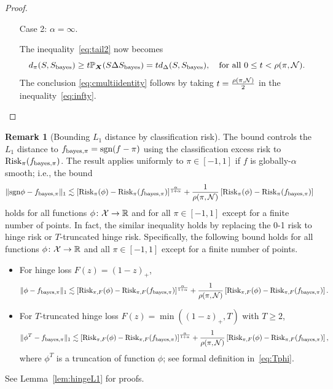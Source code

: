 \documentclass[11pt]{article}
\theoremstyle{plain}
\theoremstyle{definition}
\newtheorem{rmk}{Remark}
\def\sign{\textup{sgn}}
\def\bayesS{S_{\textup{bayes}}}
\def\bayespif{f_{\textup{bayes},\pi}}
\def\risk{\textup{Risk}_\pi}
\def\riskF{\textup{Risk}_{\pi,F}}
\begin{document}
\begin{proof}
\begin{enumerate}[label={2.\arabic*},wide, labelwidth=!, labelindent=0pt]
\item [Case 2:] $\alpha = \infty$.

The inequality~\eqref{eq:tail2} now becomes
\begin{equation}\label{eq:infty}
d_\pi(S,\bayesS)\geq t\mathbb{P}_{\mX}(S\Delta \bayesS) = td_\Delta(S,\bayesS), \quad \text{for all }0\leq t < \rho(\pi,\tN).
\end{equation}
The conclusion \eqref{eq:cmultiidentity} follows by taking $t={\rho(\pi,\mathcal{N})\over 2}$ in the inequality~\eqref{eq:infty}. 
\end{enumerate}
\end{proof}


\begin{rmk}[Bounding $L_1$ distance by classification risk]\label{eq:rmk} The bound controls the $L_1$ distance to $\bayespif=\sign(f-\pi)$ using the classification excess risk to $\risk(\bayespif)$. The result applies uniformly to $\pi\in[-1,1]$ if $f$ is globally-$\alpha$ smooth; i.e., the bound
\begin{equation}\label{eq:L1}
\onenormSize{}{\sign \phi-\bayespif} \lesssim \left[\risk(\phi)-\risk(\bayespif)\right]^{\alpha \over 1+\alpha}+{1\over \rho(\pi, \tN)}\left[\risk(\phi)-\risk(\bayespif)\right]
\end{equation}
holds for all functions $\phi\colon \mathcal{X}\to\mathbb{R}$ and for all $\pi\in[-1,1]$ except for a finite number of points. 
In fact, the similar inequality holds by replacing the 0-1 risk to hinge risk or $T$-truncated hinge risk. Specifically, the following bound holds for all functions $\phi\colon \mathcal{X}\to \mathbb{R}$ and all $\pi\in[-1,1]$ except for a finite number of points.
\begin{itemize}
\item For hinge loss $F(z)=(1-z)_{+}$,
\[
\onenormSize{}{\phi-\bayespif} \lesssim \left[\riskF(\phi)-\riskF(\bayespif)\right]^{\alpha \over 1+\alpha}+{1\over \rho(\pi, \tN)}\left[\riskF(\phi)-\riskF(\bayespif)\right].
\]
\item For $T$-truncated hinge loss $F(z)=\min((1-z)_{+},T)$ with $T\geq 2$,
\[
\onenormSize{}{\phi^T-\bayespif} \lesssim \left[\riskF(\phi)-\riskF(\bayespif)\right]^{\alpha \over 1+\alpha}+{1\over \rho(\pi, \tN)}\left[\riskF(\phi)-\riskF(\bayespif)\right],
\]
where $\phi^T$ is a truncation of function $\phi$; see formal definition in~\eqref{eq:Tphi}.
\end{itemize}
See Lemma~\ref{lem:hingeL1} for proofs. 
\end{rmk}
\end{document}
